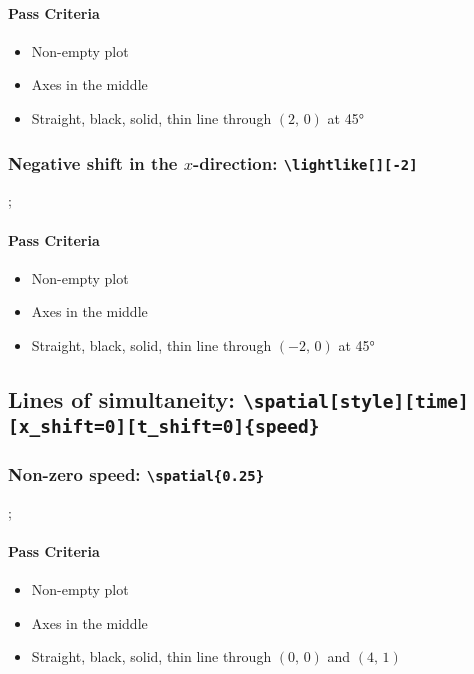 \documentclass[pagesize,headsepline,parskip=half]{scrartcl}
\begin{document}
            \paragraph{Pass Criteria}
              \begin{itemize}
                \item Non-empty plot
                \item Axes in the middle
                \item Straight, black, solid, thin line through $(2, \, 0)$ at 45°
              \end{itemize}

          \subsubsection{Negative shift in the $x$-direction: \texttt{\textbackslash{}lightlike[][-2]}}
            \begin{spacetimediagram}
              \lightlike[][-2];
            \end{spacetimediagram}

            \paragraph{Pass Criteria}
              \begin{itemize}
                \item Non-empty plot
                \item Axes in the middle
                \item Straight, black, solid, thin line through $(-2, \, 0)$ at 45°
              \end{itemize}

        \subsection{Lines of simultaneity: \texttt{\textbackslash{}spatial[style][time][x\_shift=0][t\_shift=0]\{speed\}}}
          \subsubsection{Non-zero speed: \texttt{\textbackslash{}spatial\{0.25\}}}
            \begin{spacetimediagram}[grid, ymax=4]
              ;
            \end{spacetimediagram}

            \paragraph{Pass Criteria}
              \begin{itemize}
                \item Non-empty plot
                \item Axes in the middle
                \item Straight, black, solid, thin line through $(0, \, 0)$ and $(4, \, 1)$
              \end{itemize}
\end{document}
